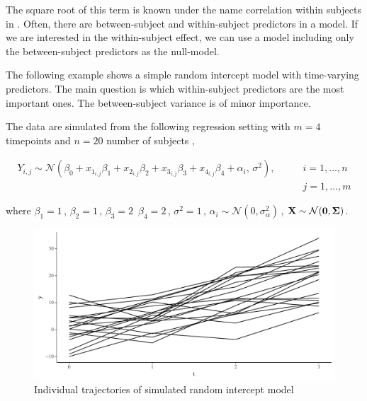 \documentclass[11pt,a4paper,twoside]{book}
\newenvironment{knitrout}{}{} %
\begin{document}
The square root of this term is known under the name correlation within subjects in \cite{Bland1995}. Often, there are between-subject and within-subject predictors in a model. If we are interested in the within-subject effect, we can use a model including only the between-subject predictors as the null-model.

The following example shows a simple random intercept model with time-varying predictors. The main question is which within-subject predictors are the most important ones. The between-subject variance is of minor importance. 

The data are simulated from the following regression setting with $m = 4$ timepoints and $n = 20$ number of subjects ,

\begin{align*} 
Y_{i,j} \sim \mathcal{N}(\beta_{0}+x_{1_{i,j}} \beta_{1}+x_{2_{i,j}} \beta_{2}+x_{3_{i,j}} \beta_{3}+x_{4_{i,j}} \beta_{4} + \alpha_{i}, \, \sigma^2), \qquad &i = 1, \dots, n \\  &j = 1, \dots, m
\end{align*} 

where $\beta_{1} = 1 \,$,  $\beta_{2} = 1 \,$,   $\beta_{3} = 2 \,$  $\beta_{4}=2 \,$, $\sigma^2 = 1 \, $, $\alpha_{i} \sim \mathcal{N}(0, \sigma_{\alpha}^2) \,$, ${\mathbf{X}} \sim \mathcal{N}({\mathbf{0}}, {\boldsymbol{\Sigma}}{})$.



\begin{knitrout}
\color{fgcolor}\begin{figure}

{\centering \includegraphics[width=\textwidth-3cm]{figure/ch04_fig_repeated_plot_ri-1} 

}

\caption[Individual trajectories of simulated random intercept model]{Individual trajectories of simulated random intercept model}\label{fig:.repeated.plot.ri}
\end{figure}


\end{knitrout}
\end{document}

